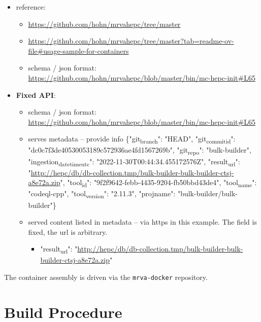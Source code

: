 \documentclass[11pt]{article}
\begin{document}
\begin{enumerate}
\begin{itemize}
\begin{itemize}
\item reference:
\begin{itemize}
\item \url{https://github.com/hohn/mrvahepc/tree/master}
\item \url{https://github.com/hohn/mrvahepc/tree/master?tab=readme-ov-file\#usage-sample-for-containers}
\item schema / json format: \url{https://github.com/hohn/mrvahepc/blob/master/bin/mc-hepc-init\#L65}
\end{itemize}

\item \textbf{Fixed API}:
\begin{itemize}
\item schema / json format: \url{https://github.com/hohn/mrvahepc/blob/master/bin/mc-hepc-init\#L65}
\item serves metadata -- provide info
\{"git\textsubscript{branch}": "HEAD", "git\textsubscript{commit}\textsubscript{id}": "dc0c7f3de40530053189c572936ae4fd1567269b", "git\textsubscript{repo}": "bulk-builder", "ingestion\textsubscript{datetime}\textsubscript{utc}": "2022-11-30T00:44:34.455172576Z", "result\textsubscript{url}": "\url{http://hepc/db/db-collection.tmp/bulk-builder-bulk-builder-ctsj-a8e72a.zip}", "tool\textsubscript{id}": "9f2f9642-febb-4435-9204-fb50bbd43de4", "tool\textsubscript{name}": "codeql-cpp", "tool\textsubscript{version}": "2.11.3", "projname": "bulk-builder/bulk-builder"\}
\item served content listed in metadata -- via https in this example.
The field is fixed, the url is arbitrary.
\begin{itemize}
\item "result\textsubscript{url}":
"\url{http://hepc/db/db-collection.tmp/bulk-builder-bulk-builder-ctsj-a8e72a.zip}"
\end{itemize}
\end{itemize}
\end{itemize}
\end{itemize}
\end{enumerate}

The container assembly is driven via the \texttt{mrva-docker} repository.
\section{Build Procedure}
\label{sec:org6f1c38a}
\end{document}
